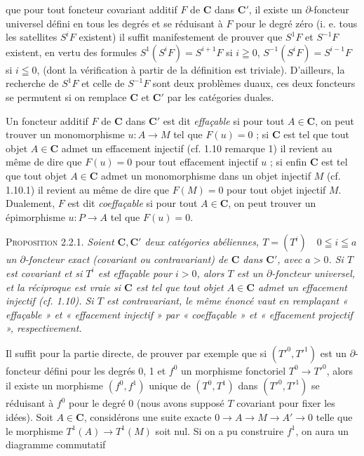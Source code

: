 
\noindent que pour tout foncteur covariant additif $F$ de $\mathbf{C}$ dans $\mathbf{C}'$, il
existe un $\partial$-foncteur universel défini en tous les degrés et se
réduisant à $F$ pour le degré zéro (i. e. tous les satellites $S^iF$
existent) il suffit manifestement de prouver que $S^1F$ et $S^{-1}F$ existent,
en vertu des formules
$S^1(S^iF)=S^{i+1}F$ si $i\geqq0$, $S^{-1}(S^iF)=S^{i-1}F$ si $i\leqq0$,
(dont la vérification à partir de la définition est triviale).
D'ailleurs, la recherche de $S^1F$ et celle de $S^{-1}F$ sont deux problèmes
duaux, ces
deux foncteurs se permutent si on remplace $\mathbf{C}$ et $\mathbf{C}'$ par les catégories
duales.

Un foncteur additif $F$ de $\mathbf{C}$ dans $\mathbf{C}'$ est dit \textit{effaçable} si pour
tout $A\in \mathbf{C}$, on peut trouver un monomorphisme $u:A\to M$ tel que
$F(u)=0$ ; si $\mathbf{C}$ est tel que tout objet $A\in \mathbf{C}$ admet un effacement injectif
(cf. 1.10 remarque 1) il revient au même de dire que $F(u)=0$ pour tout
effacement injectif $u$ ; si enfin $\mathbf{C}$ est tel que tout objet $A\in \mathbf{C}$ admet
un monomorphisme dans un objet injectif $M$ (cf. 1.10.1) il revient au même de
dire que $F(M)=0$ pour tout objet injectif $M$. Dualement, $F$ est dit
\textit{coeffaçable} si pour tout $A\in \mathbf{C}$, on peut trouver un épimorphisme
$u:P\to A$ tel que $F(u)=0$.

\indent\textsc{Proposition 2.2.1.} \textit{Soient $\mathbf{C},\mathbf{C}'$ deux catégories
abéliennes, $T=(T^i)\quad 0\leqq i\leqq a$ un $\partial$-foncteur exact (covariant
ou contravariant) de $\mathbf{C}$ dans $\mathbf{C}'$, avec $a>0$. Si $T$ est covariant et si
$T^i$ est effaçable pour $i>0$, alors $T$ est un $\partial$-foncteur universel,
et la réciproque est vraie si $\mathbf{C}$ est tel que tout objet $A\in \mathbf{C}$ admet un
effacement injectif \textup{(}\textit{cf.}\textup{ 1.10)}. Si $T$ est contravariant, le même énoncé vaut
en remplaçant « effaçable » et « effacement injectif » par « coeffaçable » et
« effacement projectif », respectivement.}

Il suffit pour la partie directe, de prouver par exemple que si
$(T'^0,T'^1)$ est un $\partial$-foncteur défini pour les degrés 0, 1 et $f^0$
un morphisme fonctoriel $T^0\to T'^0$, alors il existe un
morphisme $(f^0,f^1)$ unique de $(T^0,T^1)$ dans $(T'^0,T'^1)$ se réduisant à
$f^0$ pour le degré 0 (nous avons supposé $T$ covariant pour fixer les idées).
Soit $A\in \mathbf{C}$, considérons une suite exacte
$0\to A\to M\to A'\to 0$
telle que le morphisme $T^1(A)\to T^1(M)$ soit nul. Si on a pu
construire $f^1$, on aura un diagramme commutatif


